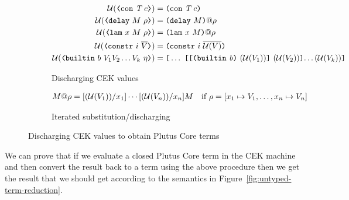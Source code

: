 \begin{figure}[H]
  \centering

  \begin{subfigure}[b]{\textwidth}
    \begin{align*}
      \unload{\VCon{\tn}{c}} &= \con{\tn}{c}\\
      \unload{\VDelay{M}{\rho}}
        &= \Unload{\rho}{\delay{M}}\\
      \unload{\VLamAbs{x}{M}{\rho}} &= \Unload{\rho}{\lamU{x}{M}}\\
      \unload{\VConstr{i}{\repetition{V}}} &= \constr{i}{\repetition{\unload{V}}}\\
      \unload{\VBuiltin{b}{V_1 V_2\ldots V_k}{\eta}} &=
      \appU{\ldots}  %
           {\appU
             {\appU
               {\builtin{b}}
               {(\unload{V_1})}
             }
             {(\unload{V_2})}
             {\ldots (\unload{V_k})}
           }
    \end{align*}
    \caption{Discharging CEK values}
    \label{fig:discharge-val}
  \end{subfigure}

  \begin{subfigure}[c]{\textwidth}
    \begin{align*}
      {M}@{\rho} &= [(\mathcal{U}(V_1))/x_1]\cdots[(\mathcal{U}(V_n))/x_n]M \quad
      \text{if $\rho = [x_1 \mapsto V_1, \ldots, x_n \mapsto V_n]$}
    \end{align*}
    \caption{Iterated substitution/discharging}
    \label{fig:discharge-env}
  \end{subfigure}

  \caption{Discharging CEK values to obtain Plutus Core terms}
  \label{fig:discharge-cek-val}
\end{figure}%
%

\noindent We can prove that if we evaluate a closed Plutus Core term in the CEK
machine and then convert the result back to a term using the above procedure
then we get the result that we should get according to the semantics in
Figure~\ref{fig:untyped-term-reduction}.
